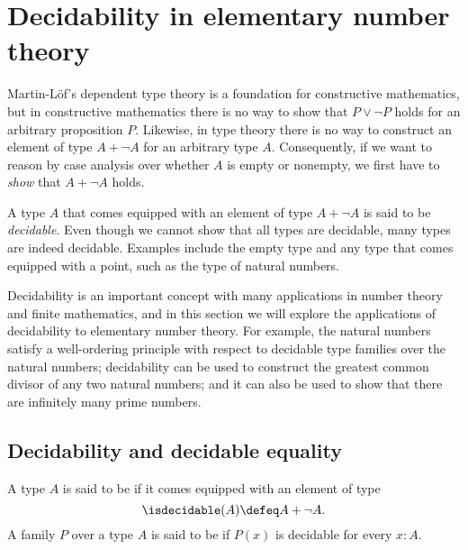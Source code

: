 \section{Decidability in elementary number theory}\label{sec:decidability}

Martin-L\"of's dependent type theory is a foundation for constructive mathematics, but in constructive mathematics there is no way to show that $P\lor\neg P$ holds for an arbitrary proposition $P$. Likewise, in type theory there is no way to construct an element of type $A+\neg A$ for an arbitrary type $A$. Consequently, if we want to reason by case analysis over whether $A$ is empty or nonempty, we first have to \emph{show} that $A+\neg A$ holds.

A type $A$ that comes equipped with an element of type $A+\neg A$ is said to be \emph{decidable}. Even though we cannot show that all types are decidable, many types are indeed decidable. Examples include the empty type and any type that comes equipped with a point, such as the type of natural numbers.

Decidability is an important concept with many applications in number theory and finite mathematics, and in this section we will explore the applications of decidability to elementary number theory. For example, the natural numbers satisfy a well-ordering principle with respect to decidable type families over the natural numbers; decidability can be used to construct the greatest common divisor of any two natural numbers; and it can also be used to show that there are infinitely many prime numbers.

\subsection{Decidability and decidable equality}

\begin{defn}
  A type $A$ is said to be  if it comes equipped with an element of type
  \begin{equation*}
    \isdecidable(A)\defeq A+\neg A.
  \end{equation*}
  A family $P$ over a type $A$ is said to be  if $P(x)$ is decidable for every $x:A$.
\end{defn}

